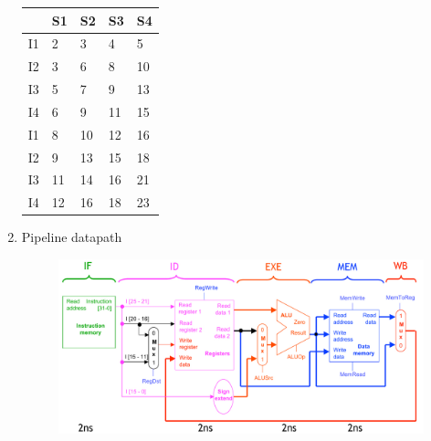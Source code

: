 \begin{enumerate}
   \begin{myTableStyle} \begin{tabular}{ |m{1cm}|m{1cm}|m{1cm}|m{1cm}|m{1cm}| } \hline
                   & S1 & S2 & S3  & S4 \\ \hline
                I1 & 2  & 3  & 4   & 5  \\ \hline
                I2 & 3  & 6  & 8   & 10  \\ \hline
                I3 & 5  & 7  & 9   & 13  \\ \hline
                I4 & 6  & 9  & 11  & 15  \\ \hline
                I1 & 8  & 10 & 12  & 16  \\ \hline
                I2 & 9  & 13 & 15  & 18  \\ \hline
                I3 & 11 & 14 & 16  & 21  \\ \hline
                I4 & 12 & 16 & 18  & 23  \\ \hline
              \end{tabular} \end{myTableStyle} \vspace{0.08in}

    \item Pipeline datapath \\
        \begin{figure}[h]
            \centering   \includegraphics[scale=0.5]{./images/pipeline_datapath.jpeg}
        \end{figure}

\end{enumerate}
